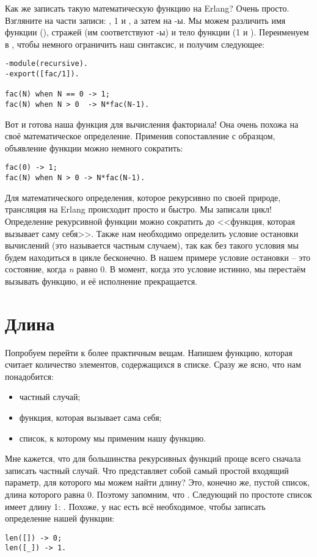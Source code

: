 Как же записать такую математическую функцию на Erlang? Очень просто.
Взгляните на части записи: , 1 и , а затем на \--ы.
Мы можем различить имя функции (), стражей (им соответствуют \--ы) и тело функции (1 и ).
Переименуем  в , чтобы немного ограничить наш синтаксис, и получим следующее:
\begin{lstlisting}[style=erlang]
-module(recursive).
-export([fac/1]).
 
fac(N) when N == 0 -> 1;
fac(N) when N > 0  -> N*fac(N-1).
\end{lstlisting}

Вот и готова наша функция для вычисления факториала!
Она очень похожа на своё математическое определение.
Применив сопоставление с образцом, объявление функции можно немного сократить:
\begin{lstlisting}[style=erlang]
fac(0) -> 1;
fac(N) when N > 0 -> N*fac(N-1).
\end{lstlisting}

Для математического определения, которое рекурсивно по своей природе, трансляция на Erlang происходит просто и быстро.
Мы записали цикл!
Определение рекурсивной функции можно сократить до <<функция, которая вызывает саму себя>>.
Также нам необходимо определить условие остановки вычислений (это называется частным случаем), так как без такого условия мы будем находиться в цикле бесконечно.
В нашем примере условие остановки \--- это состояние, когда \emph{n} равно 0.
В момент, когда это условие истинно, мы перестаём вызывать функцию, и её исполнение прекращается. 
\section{Длина}
\label{length}
Попробуем перейти к более практичным вещам.
Напишем функцию, которая считает количество элементов, содержащихся в списке.
Сразу же ясно, что нам понадобится:\\
\begin{itemize}
\item частный случай;
\item функция, которая вызывает сама себя;
\item список, к которому мы применим нашу функцию.
\end{itemize}

Мне кажется, что для большинства рекурсивных функций проще всего сначала записать частный случай.
Что представляет собой самый простой входящий параметр, для которого мы можем найти длину?
Это, конечно же, пустой список, длина которого равна 0.
Поэтому запомним, что .
Следующий по простоте список имеет длину 1: .
Похоже, у нас есть всё необходимое, чтобы записать определение нашей функции:
\begin{lstlisting}[style=erlang]
len([]) -> 0;
len([_]) -> 1.
\end{lstlisting}

